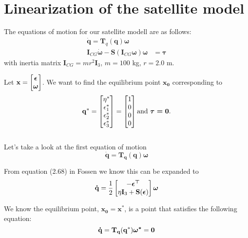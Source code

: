 \section{Linearization of the satellite model}

The equations of motion for our satellite modell are as follows:
\begin{equation*}
\label{eq:dynamics}
	\begin{aligned}
		\dot{\mathbf{q}} = \mathbf{T}_q (\mathbf{q} ) \boldsymbol{\omega} \\
		\mathbf{I}_{CG} \dot{\boldsymbol{\omega}} - \mathbf{S} (\mathbf{I}_{CG} \boldsymbol{\omega} ) \boldsymbol{\omega} & =  \boldsymbol{\tau}
	\end{aligned}	
\end{equation*}
with inertia matrix $\mathbf{I}_{CG} = mr^2 \mathbf{I}_3$, $m = 100$ kg, $r = 2.0$ m.

Let $\mathbf{x = \begin{bmatrix}\boldsymbol{\epsilon} \\ \boldsymbol{\omega}\end{bmatrix}}$. We want to find the equilibrium point $\mathbf{x_0}$ corresponding to $$\mathbf{q^*} = \begin{bmatrix}\eta^* \\ \epsilon_1^* \\ \epsilon_2^* \\ \epsilon_3^*\end{bmatrix} = \begin{bmatrix}1 \\ 0 \\ 0 \\ 0\end{bmatrix} \text{and } \boldsymbol{\tau = \mathbf{0}}.$$ \\
Let's take a look at the first equation of motion
\begin{equation*}
    \mathbf{\dot{q} = T_q(q)\boldsymbol{\omega}}
\end{equation*} 

From equation (2.68) in Fossen\cite{bok} we know this can be expanded to
\begin{equation*}
    \mathbf{\dot q} = \frac{1}{2} \begin{bmatrix}-\boldsymbol{\epsilon^\top} \\ \eta \mathbf{I}_3 + \mathbf{S}(\boldsymbol{\epsilon})\end{bmatrix}\boldsymbol{\omega}
\end{equation*} 

We know the equilibrium point, $\mathbf{x_0 = x^*}$, is a point that satisfies the following equation:
\begin{equation*}
    \mathbf{\dot q = T_q(q^*) \\ \boldsymbol{\omega^*} = 0 }
\end{equation*}


